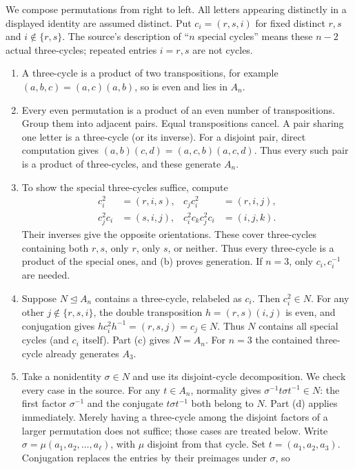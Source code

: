 We compose permutations from right to left. All letters appearing distinctly in a displayed identity are assumed distinct. Put $c_i=(r,s,i)$ for fixed distinct $r,s$ and $i\notin\{r,s\}$. The source's description of ``$n$ special cycles'' means these $n-2$ actual three-cycles; repeated entries $i=r,s$ are not cycles.
\begin{enumerate}[label=(\alph*)]
\item A three-cycle is a product of two transpositions, for example $(a,b,c)=(a,c)(a,b)$, so is even and lies in $A_n$.
\item Every even permutation is a product of an even number of transpositions. Group them into adjacent pairs. Equal transpositions cancel. A pair sharing one letter is a three-cycle (or its inverse). For a disjoint pair, direct computation gives $(a,b)(c,d)=(a,c,b)(a,c,d)$. Thus every such pair is a product of three-cycles, and these generate $A_n$.
\item To show the special three-cycles suffice, compute
\begin{align*}
c_i^2&=(r,i,s),&c_jc_i^2&=(r,i,j),\\
c_j^2c_i&=(s,i,j),&c_i^2c_kc_j^2c_i&=(i,j,k).
\end{align*}
Their inverses give the opposite orientations. These cover three-cycles containing both $r,s$, only $r$, only $s$, or neither. Thus every three-cycle is a product of the special ones, and (b) proves generation. If $n=3$, only $c_i,c_i^{-1}$ are needed.
\item Suppose $N\trianglelefteq A_n$ contains a three-cycle, relabeled as $c_i$. Then $c_i^2\in N$. For any other $j\notin\{r,s,i\}$, the double transposition $h=(r,s)(i,j)$ is even, and conjugation gives $hc_i^2h^{-1}=(r,s,j)=c_j\in N$. Thus $N$ contains all special cycles (and $c_i$ itself). Part (c) gives $N=A_n$. For $n=3$ the contained three-cycle already generates $A_3$.
\item Take a nonidentity $\sigma\in N$ and use its disjoint-cycle decomposition. We check every case in the source. For any $t\in A_n$, normality gives $\sigma^{-1}t\sigma t^{-1}\in N$: the first factor $\sigma^{-1}$ and the conjugate $t\sigma t^{-1}$ both belong to $N$.
 Part (d) applies immediately. Merely having a three-cycle among the disjoint factors of a larger permutation does not suffice; those cases are treated below.
 Write $\sigma=\mu(a_1,a_2,\ldots,a_\ell)$, with $\mu$ disjoint from that cycle. Set $t=(a_1,a_2,a_3)$. Conjugation replaces the entries by their preimages under $\sigma$, so

\end{enumerate}

